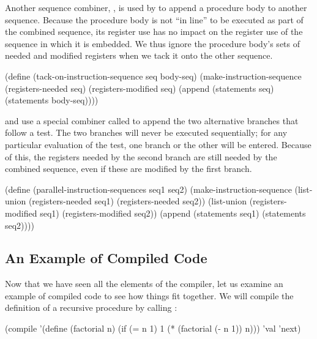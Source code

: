 \noindent
Another sequence combiner, , is used by
 to append a procedure body to another sequence.  Because
the procedure body is not ``in line'' to be executed as part of the combined
sequence, its register use has no impact on the register use of the sequence in
which it is embedded.  We thus ignore the procedure body's sets of needed and
modified registers when we tack it onto the other sequence.

\begin{codeBlock}
(define (tack-on-instruction-sequence seq body-seq)
  (make-instruction-sequence
   (registers-needed seq)
   (registers-modified seq)
   (append (statements seq)
           (statements body-seq))))
\end{codeBlock}

\noindent
{} and  use a special combiner
called  to append the two alternative
branches that follow a test.  The two branches will never be executed
sequentially; for any particular evaluation of the test, one branch or the
other will be entered.  Because of this, the registers needed by the second
branch are still needed by the combined sequence, even if these are modified by
the first branch.

\begin{codeBlock}
(define (parallel-instruction-sequences seq1 seq2)
  (make-instruction-sequence
   (list-union (registers-needed seq1)
               (registers-needed seq2))
   (list-union (registers-modified seq1)
               (registers-modified seq2))
   (append (statements seq1)
           (statements seq2))))
\end{codeBlock}

\subsection{An Example of Compiled Code}
\label{Section 5.5.5}

Now that we have seen all the elements of the compiler, let us examine an
example of compiled code to see how things fit together.  We will compile the
definition of a recursive  procedure by calling :

\begin{codeBlock}
(compile
 '(define (factorial n)
    (if (= n 1)
        1
        (* (factorial (- n 1)) n)))
 'val
 'next)
\end{codeBlock}

